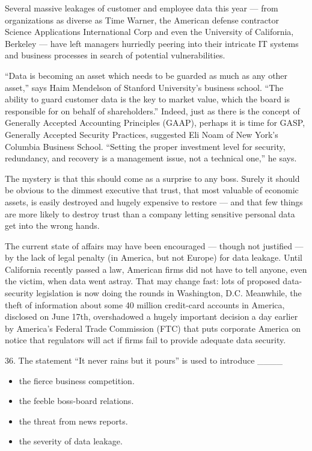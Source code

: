 \documentclass[UTF8,11pt]{ctexart}
\begin{document}
Several massive leakages of customer and employee data this year — from organizations as diverse as Time Warner, the American defense contractor Science Applications International Corp and even the University of California, Berkeley — have left managers hurriedly peering into their intricate IT systems and business processes in search of potential vulnerabilities.


“Data is becoming an asset which needs to be guarded as much as any other asset,” says Haim Mendelson of Stanford University’s business school. “The ability to guard customer data is the key to market value, which the board is responsible for on behalf of shareholders.” Indeed, just as there is the concept of Generally Accepted Accounting Principles (GAAP), perhaps it is time for GASP, Generally Accepted Security Practices, suggested Eli Noam of New York’s Columbia Business School. “Setting the proper investment level for security, redundancy, and recovery is a management issue, not a technical one,” he says.


The mystery is that this should come as a surprise to any boss. Surely it should be obvious to the dimmest executive that trust, that most valuable of economic assets, is easily destroyed and hugely expensive to restore — and that few things are more likely to destroy trust than a company letting sensitive personal data get into the wrong hands.


The current state of affairs may have been encouraged — though not justified — by the lack of legal penalty (in America, but not Europe) for data leakage. Until California recently passed a law, American firms did not have to tell anyone, even the victim, when data went astray. That may change fast: lots of proposed data-security legislation is now doing the rounds in Washington, D.C. Meanwhile, the theft of information about some 40 million credit-card accounts in America, disclosed on June 17th, overshadowed a hugely important decision a day earlier by America’s Federal Trade Commission (FTC) that puts corporate America on notice that regulators will act if firms fail to provide adequate data security.


36. The statement “It never rains but it pours” is used to introduce \_\_\_\_


\begin{itemize}[leftmargin=2em,itemsep=.2em,topsep=.4em]\item[A.] the fierce business competition.
\item[B.] the feeble boss-board relations.
\item[C.] the threat from news reports.
\item[D.] the severity of data leakage.
\end{itemize}
\end{document}
